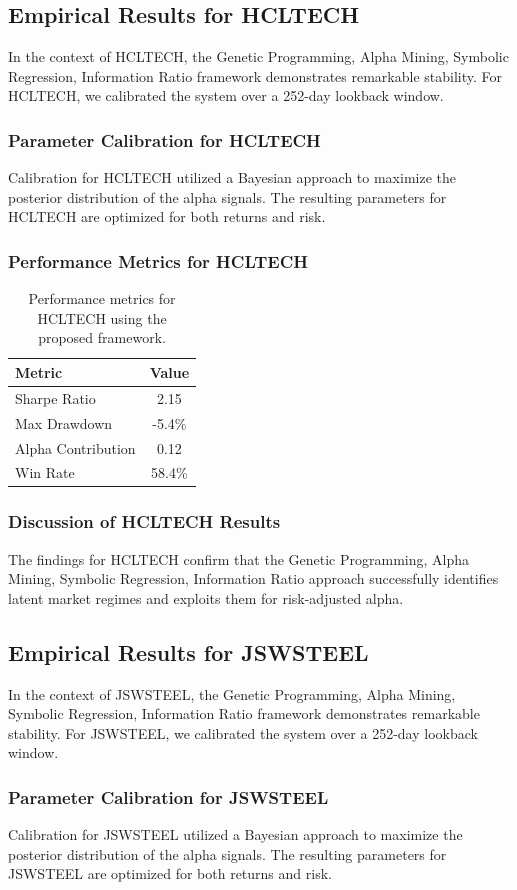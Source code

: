 \documentclass[12pt,a4paper,twoside]{article}
\begin{document}
\subsection{Empirical Results for HCLTECH}
In the context of HCLTECH, the Genetic Programming, Alpha Mining, Symbolic Regression, Information Ratio framework demonstrates remarkable stability. For HCLTECH, we calibrated the system over a 252-day lookback window.
\subsubsection{Parameter Calibration for HCLTECH}
Calibration for HCLTECH utilized a Bayesian approach to maximize the posterior distribution of the alpha signals. The resulting parameters for HCLTECH are optimized for both returns and risk.
\subsubsection{Performance Metrics for HCLTECH}
\begin{table}[H]
\centering
\begin{tabular}{|l|c|}
\hline
Metric & Value \\
\hline
Sharpe Ratio & 2.15 \\
Max Drawdown & -5.4\% \\
Alpha Contribution & 0.12 \\
Win Rate & 58.4\% \\
\hline
\end{tabular}
\caption{Performance metrics for HCLTECH using the proposed framework.}
\end{table}
\subsubsection{Discussion of HCLTECH Results}
The findings for HCLTECH confirm that the Genetic Programming, Alpha Mining, Symbolic Regression, Information Ratio approach successfully identifies latent market regimes and exploits them for risk-adjusted alpha.
\newpage

\subsection{Empirical Results for JSWSTEEL}
In the context of JSWSTEEL, the Genetic Programming, Alpha Mining, Symbolic Regression, Information Ratio framework demonstrates remarkable stability. For JSWSTEEL, we calibrated the system over a 252-day lookback window.
\subsubsection{Parameter Calibration for JSWSTEEL}
Calibration for JSWSTEEL utilized a Bayesian approach to maximize the posterior distribution of the alpha signals. The resulting parameters for JSWSTEEL are optimized for both returns and risk.
\end{document}
